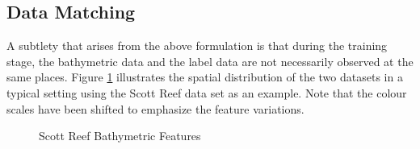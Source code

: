 		\subsection{Data Matching}
		\label{BenthicHabitatMapping:BathymetricFeatures:DataMatching}
		
			A subtlety that arises from the above formulation is that during the training stage, the bathymetric data and the label data are not necessarily observed at the same places. Figure \ref{Figure:ScottReefBathymetricFeatures} illustrates the spatial distribution of the two datasets in a typical setting using the Scott Reef data set \citep{IMOS} as an example. Note that the colour scales have been shifted to emphasize the feature variations.
		
			\begin{figure}[!htbp]
			\centering
			\caption{Scott Reef Bathymetric Features}
			\label{Figure:ScottReefBathymetricFeatures}
			\end{figure}
			
			
